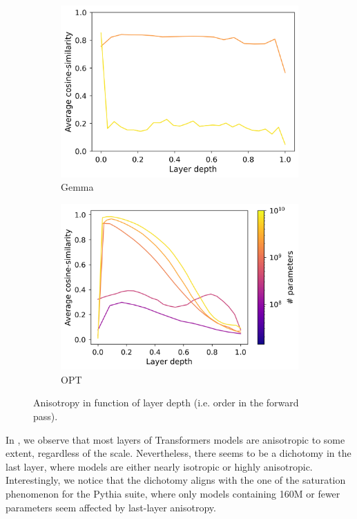 \begin{figure}[h]
\begin{subfigure}{0.33\columnwidth}
         \includegraphics[width=\linewidth]{sources/part_1/softmax_bottleneck/imgs/gemma_anisotropy.png}
         \caption{Gemma}
         \label{fig:gemma_aniso}
    \end{subfigure}
    \begin{subfigure}{0.34\columnwidth}
         \includegraphics[width=\linewidth]{sources/part_1/softmax_bottleneck/imgs/opt_anisotropy.png}
         \caption{OPT}
         \label{fig:opt_aniso}
    \end{subfigure}
    \caption{Anisotropy in function of layer depth (i.e. order in the forward pass).}
    \label{fig:anisotropy}
\end{figure}

In , we observe that most layers of Transformers models are anisotropic to some extent, regardless of the scale. Nevertheless, there seems to be a dichotomy in the last layer, where models are either nearly isotropic or highly anisotropic. Interestingly, we notice that the dichotomy aligns with the one of the saturation phenomenon for the Pythia suite, where only models containing 160M or fewer parameters seem affected by last-layer anisotropy.

